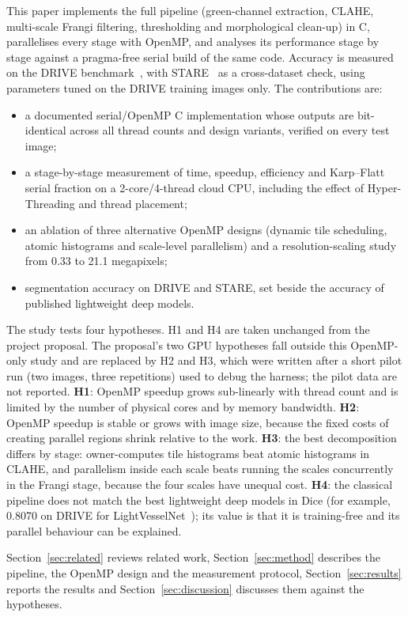 This paper implements the full pipeline (green-channel extraction, CLAHE, multi-scale Frangi filtering,
thresholding and morphological clean-up) in C, parallelises every stage with OpenMP, and analyses its
performance stage by stage against a pragma-free serial build of the same code. Accuracy is measured on the
DRIVE benchmark~\cite{staal2004}, with STARE~\cite{hoover2000} as a cross-dataset check, using parameters tuned
on the DRIVE training images only. The contributions are:
\begin{itemize}
\item a documented serial/OpenMP C implementation whose outputs are bit-identical across all thread counts and
design variants, verified on every test image;
\item a stage-by-stage measurement of time, speedup, efficiency and Karp--Flatt serial fraction on a
2-core/4-thread cloud CPU, including the effect of Hyper-Threading and thread placement;
\item an ablation of three alternative OpenMP designs (dynamic tile scheduling, atomic histograms and
scale-level parallelism) and a resolution-scaling study from 0.33 to 21.1 megapixels;
\item segmentation accuracy on DRIVE and STARE, set beside the accuracy of published lightweight deep
models.
\end{itemize}

The study tests four hypotheses. H1 and H4 are taken unchanged from the project proposal. The proposal's two
GPU hypotheses fall outside this OpenMP-only study and are replaced by H2 and H3, which were written after a
short pilot run (two images, three repetitions) used to debug the harness; the pilot data are not reported.
\textbf{H1}: OpenMP speedup grows sub-linearly with thread count and is limited by the number of physical
cores and by memory bandwidth.
\textbf{H2}: OpenMP speedup is stable or grows with image size, because the fixed costs of creating parallel
regions shrink relative to the work.
\textbf{H3}: the best decomposition differs by stage: owner-computes tile histograms beat atomic
histograms in CLAHE, and parallelism inside each scale beats running the scales concurrently in the Frangi
stage, because the four scales have unequal cost.
\textbf{H4}: the classical pipeline does not match the best lightweight deep models in Dice (for example,
0.8070 on DRIVE for LightVesselNet~\cite{sobhan2026}); its value is that it is training-free and its parallel
behaviour can be explained.

Section~\ref{sec:related} reviews related work, Section~\ref{sec:method} describes the pipeline, the OpenMP
design and the measurement protocol, Section~\ref{sec:results} reports the results and
Section~\ref{sec:discussion} discusses them against the hypotheses.
